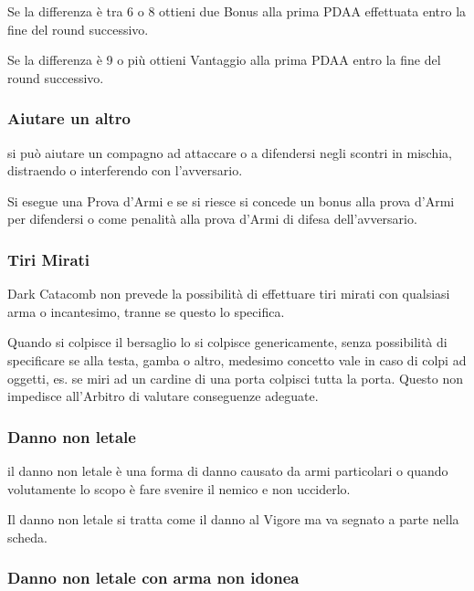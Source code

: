 \documentclass[12pt,a4paper,twoside,openany]{book}
\begin{document}
\begin{multicols}{2}
Se la differenza è tra 6 o 8 ottieni due Bonus alla prima PDAA effettuata entro la fine del round successivo.

Se la differenza è 9 o più ottieni Vantaggio alla prima PDAA entro la fine del round successivo.

\subsubsection{Aiutare un altro}\label{aiutare}

si può aiutare un compagno ad attaccare o a difendersi negli scontri in mischia, distraendo o interferendo con l'avversario. 

Si esegue una Prova d'Armi e se si riesce si concede un bonus alla prova d'Armi per difendersi o come penalità alla prova d'Armi di difesa dell'avversario.

\subsubsection{Tiri Mirati}\label{tirimirati}

Dark Catacomb non prevede la possibilità di effettuare tiri mirati con qualsiasi arma o incantesimo, tranne se questo lo specifica.

Quando si colpisce il bersaglio lo si colpisce genericamente, senza possibilità di specificare se alla testa, gamba o altro, medesimo concetto vale in caso di colpi ad oggetti, es. se miri ad un cardine di una porta colpisci tutta la porta. Questo non impedisce all'Arbitro di valutare conseguenze adeguate.

\subsubsection{Danno non letale}\label{dannononletale}

il danno non letale è una forma di danno causato da armi particolari o quando volutamente lo scopo è fare svenire il nemico e non ucciderlo.

Il danno non letale si tratta come il danno al Vigore ma va segnato a parte nella scheda.

\subsubsection{Danno non letale con arma non idonea} \label{dannononletalearmanonidonea}


\end{multicols}
\end{document}
